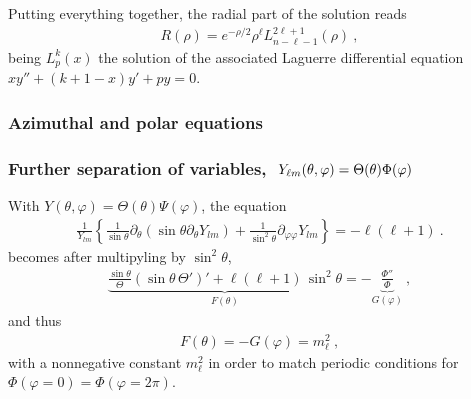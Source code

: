 \documentclass[letterpaper,10pt,english]{jupyterBook}
\begin{document}
\sphinxAtStartPar
{} Putting everything together, the radial part of the solution reads
\begin{equation*}
\begin{split}R(\rho) = e^{-\rho/2} \rho^{\ell} L^{2 \ell+1}_{n-\ell-1}(\rho) \ ,\end{split}
\end{equation*}
\sphinxAtStartPar
being \(L_{p}^{k}(x)\) the solution of the associated Laguerre differential equation \(x y'' + ( k + 1 - x ) y' + p y = 0\).
\subsubsection*{Azimuthal and polar equations}
\subsubsection*{Further separation of variables, \protect\(\ Y_{\ell m}(\theta, \varphi) = \Theta(\theta) \Phi(\varphi) \ \protect\) }

\sphinxAtStartPar
With \(Y(\theta, \varphi) = \Theta(\theta) \Psi(\varphi)\), the equation
\begin{equation*}
\begin{split}
\frac{1}{Y_{lm}} \left\{ \frac{1}{\sin\theta} \partial_\theta (\sin\theta \partial_\theta Y_{lm}) + \frac{1}{\sin^2\theta} \partial_{\varphi\varphi} Y_{lm} \right\} = - \ell ( \ell + 1 ) \ . 
\end{split}
\end{equation*}
\sphinxAtStartPar
becomes \sphinxhyphen{} after multipyling by \(\sin^2 \theta\),
\begin{equation*}
\begin{split}\underbrace{\frac{\sin \theta}{\Theta} \left( \sin \theta \, \Theta' \right)' + \ell ( \ell + 1 ) \, \sin^2 \theta}_{F(\theta)} = -\underbrace{\frac{\Phi''}{\Phi}}_{G(\varphi)} \ ,\end{split}
\end{equation*}
\sphinxAtStartPar
and thus
\begin{equation*}
\begin{split}F(\theta) = - G(\varphi) = m_\ell^2 \ ,\end{split}
\end{equation*}
\sphinxAtStartPar
with a non\sphinxhyphen{}negative constant \(m_{\ell}^2\) in order to match periodic conditions for \(\Phi(\varphi = 0) = \Phi(\varphi = 2 \pi)\).
\end{document}
